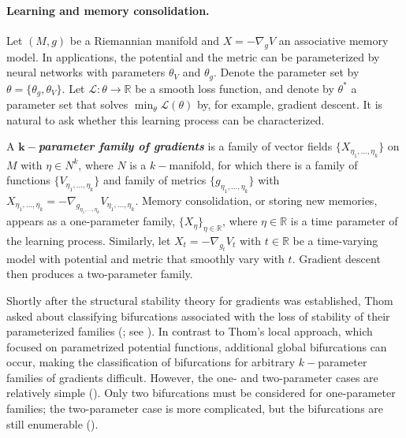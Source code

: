 \documentclass[12pt]{article}
\begin{document}

\paragraph{Learning and memory consolidation.}  Let $(M,g)$ be a Riemannian manifold and $X = -\nabla_g V$ an associative memory model. In applications, the potential and the metric can be parameterized by neural networks with parameters $\theta_V$ and $\theta_g$. Denote the parameter set by $\theta = \{ \theta_g, \theta_V\}$. Let $\mathcal{L}: \theta \rightarrow \mathbb{R}$ be a smooth loss function, and denote by $\theta^*$ a parameter set that solves $\min_{\theta} \mathcal{L}(\theta)$ by, for example, gradient descent. It is natural to ask whether this learning process can be characterized.

A \textbf{\textit{$\bm{k-}$parameter family of gradients}} is a family of vector fields $\{ X_{\eta_1,...,\eta_k} \}$ on $M$ with $\eta \in N^k$, where $N$ is a $k-$manifold, for which there is a family of functions $\{V_{\eta_1,...,\eta_k} \}$ and family of metrics $\{ g_{{\eta_1,...,\eta_k}}\}$ with $X_{\eta_1,...,\eta_k} = -\nabla_{g_{\eta_1,...,\eta_k}} V_{\eta_1,...,\eta_k}$. Memory consolidation, or storing new memories, appears as a one-parameter family, $\{X_{\eta}\}_{\eta \in \mathbb{R}}$, where $\eta \in \mathbb{R}$ is a time parameter of the learning process. Similarly, let $X_t = -\nabla_{g_{t}} V_t$ with $t\in \mathbb{R}$ be a time-varying model with potential and metric that smoothly vary with $t$. Gradient descent then produces a two-parameter family. 

Shortly after the structural stability theory for gradients was established, Thom asked about classifying bifurcations associated with the loss of stability of their parameterized families (\cite{thom1969topological,thom1972stabilite}; see ). In contrast to Thom's local approach, which focused on parametrized potential functions, additional global bifurcations can occur, making the classification of bifurcations for arbitrary $k-$parameter families of gradients difficult. However, the one- and two-parameter cases are relatively simple (\cite{palis1983stability,dias1989bifurcations}). Only two bifurcations must be considered for one-parameter families; the two-parameter case is more complicated, but the bifurcations are still enumerable (). 
\end{document}
